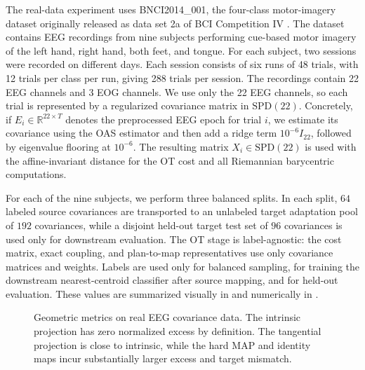 \documentclass[10pt]{article} %
\theoremstyle{definition}
\providecommand{\R}{\mathbb{R}}
\providecommand{\1}{\mathbf{1}}
\begin{document}
The real-data experiment uses \textsf{BNCI2014\_001}, the four-class motor-imagery
dataset originally released as data set 2a of BCI Competition IV
\citep{brunner_2008_BCICompetition2008,tangermann_2012_ReviewBCICompetition,jayaram_2018_MOABBTrustworthyAlgorithm}. The
dataset contains EEG recordings from nine subjects performing cue-based motor
imagery of the left hand, right hand, both feet, and tongue. For each subject,
two sessions were recorded on different days. Each session consists of six runs
of 48 trials, with 12 trials per class per run, giving 288 trials per session.
The recordings contain 22 EEG channels and 3 EOG channels. We use only the 22
EEG channels, so each trial is represented by a regularized covariance matrix
in \(\mathrm{SPD}(22)\). Concretely, if \(E_i\in \R^{22\times T}\) denotes the preprocessed EEG epoch for trial \(i\), we estimate its covariance using the OAS estimator \citep{chen_2010_ShrinkageAlgorithmsMMSE} and then add a ridge term \(10^{-6}I_{22}\), followed by eigenvalue flooring at \(10^{-6}\). The resulting matrix \(X_i\in\mathrm{SPD}(22)\) is used with the affine-invariant distance for the OT cost and all Riemannian barycentric computations.


For each of the nine subjects, we perform three balanced splits. In each split,
\(64\) labeled source covariances are transported to an unlabeled target
adaptation pool of \(192\) covariances, while a disjoint held-out target test
set of \(96\) covariances is used only for downstream evaluation. The OT stage
is label-agnostic: the cost matrix, exact coupling, and plan-to-map
representatives use only covariance matrices and weights. Labels are used only
for balanced sampling, for training the downstream nearest-centroid classifier after source
mapping, and for held-out evaluation. These values are summarized visually in  and numerically in .

\begin{figure}[t]
\centering
\resizebox{0.98\linewidth}{!}{%
	
}
\caption{Geometric metrics on real EEG covariance data. The intrinsic projection has zero normalized excess by definition. The tangential projection is close to intrinsic, while the hard MAP and identity maps incur substantially larger excess and target mismatch.}
\label{fig:eeg-geometric}
\end{figure}
\end{document}
